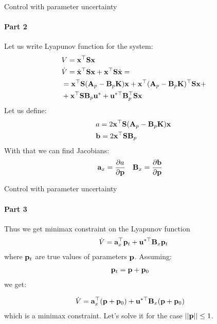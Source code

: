 \documentclass{beamer}
\begin{document}
\begin{frame}{Control with parameter uncertainty}
\framesubtitle{Part 2}
\begin{flushleft}

Let us write Lyapunov function for the system:
%
\begin{align}
    & V = \mathbf{x}^\top \mathbf{S} \mathbf{x} \\
    & \dot{V} = \dot{\mathbf{x}}^\top \mathbf{S} \mathbf{x} + \mathbf{x}^\top \mathbf{S} \dot{\mathbf{x}} 
    = \\
    & = \mathbf{x}^\top \mathbf{S}(\mathbf{A}_p - \mathbf{B}_p\mathbf{K})\mathbf{x}
    + \mathbf{x}^\top (\mathbf{A}_p - \mathbf{B}_p\mathbf{K})^\top
    \mathbf{S} \mathbf{x}
    + \\
    & + \mathbf{x}^\top \mathbf{S} \mathbf{B}_p \mathbf{u}^*
    +
    \mathbf{u}^{*\top} \mathbf{B}_p^\top \mathbf{S} \mathbf{x}
\end{align}
%
Let us define:
%
\begin{align}
    & a = 2\mathbf{x}^\top \mathbf{S}(\mathbf{A}_p - \mathbf{B}_p\mathbf{K})\mathbf{x} \\
    & \mathbf{b} = 2\mathbf{x}^\top \mathbf{S} \mathbf{B}_p
\end{align}
%
With that we can find Jacobians:
%
\begin{align}
    & \mathbf{a}_x = \frac{\partial a}{\partial \mathbf{p}} &
    & \mathbf{B}_x = \frac{\partial \mathbf{b}}{\partial \mathbf{p}}
\end{align}

\end{flushleft}
\end{frame}




\begin{frame}{Control with parameter uncertainty}
\framesubtitle{Part 3}
\begin{flushleft}

Thus we get minimax constraint on the Lyapunov function
%
\begin{align}
\dot{V} = \mathbf{a}_x^\top \mathbf{p}_t + 
\mathbf{u}^{*\top} \mathbf{B}_x \mathbf{p}_t
\end{align}
%
where $\mathbf{p}_t$ are true values of parameters $\mathbf{p}$. Assuming:
%
\begin{align}
& \mathbf{p}_t = \mathbf{p} + \mathbf{p}_0
\end{align}
%
we get:

\begin{align}
& \dot{V} = \mathbf{a}_x^\top (\mathbf{p} + \mathbf{p}_0) + 
\mathbf{u}^{*\top} \mathbf{B}_x (\mathbf{p} + \mathbf{p}_0)
\end{align}
%
which is a minimax constraint. Let's solve it for the case $||\mathbf{p}|| \leq 1$.

\end{flushleft}
\end{frame}
\end{document}
